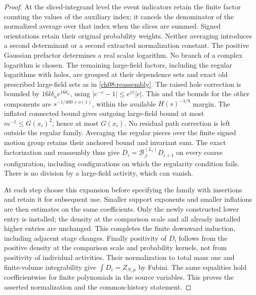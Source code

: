 \begin{proof}
At the sliced-integrand level the event indicators retain the finite factor counting the values of the
auxiliary index; it cancels the denominator of the normalized average over that index
when the slices are summed. Signed orientations retain their original
probability weights. Neither averaging introduces a second determinant
or a second extracted normalization constant.
The positive Gaussian prefactor determines a real scalar logarithm.
No branch of a complex logarithm is chosen. The remaining
large-field factors, including the regular logarithms with holes,
are grouped at their dependence sets and exact old prescribed large-field sets as in
\eqref{ch08:reassembly}. The raised hole correction is bounded by
$16l\delta_n e^{16\delta_n}$, using
$|e^{-c}-1|\le e^{|c|}|c|$.
This and the bounds for the other components are $s^{-1/400+o(1)}$, within
the available $H(s)^{-1/8}$ margin. The inflated connected bound
gives outgoing large-field bound at most $m^{-1}\le G(x_i)^2$,
hence at most $G(x_i)$. No residual path correction is left outside
the regular family. Averaging the regular pieces over the finite
signed motion group retains their anchored bound and invariant sum.
The exact factorization and reassembly thus give
$D_i=\mathcal B^{(L_i)}_\beta D_{i+1}$ on every coarse configuration,
including configurations on which the regularity condition fails. There is no division
by a large-field activity, which can vanish.

At each step choose this expansion before specifying the
family with insertions and retain it for subsequent use. Smaller support exponents
and smaller inflations are then estimates on the same coefficients.
Only the newly constructed lower entry is installed; the density at the comparison scale
and all already installed higher entries are unchanged. This completes
the finite downward induction, including adjacent stage changes.
Finally positivity of $D_i$ follows from the positive density at the comparison scale and
probability kernels, not from positivity of individual activities.
Their normalization to total mass one and finite-volume integrability give
$\int D_i=Z_{N,p}$ by Fubini. The same equalities hold coefficientwise
for finite polynomials in the source variables. This proves the asserted normalization
and the common-history statement.
\end{proof}

